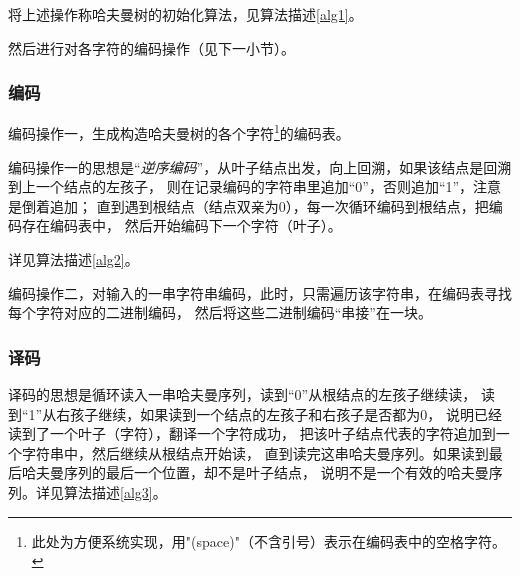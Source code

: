 \documentclass{ctexart}
\begin{document}
    将上述操作称哈夫曼树的初始化算法，见算法描述\ref{alg1}。

    然后进行对各字符的编码操作（见下一小节）。

    \subsubsection{编码}
    编码操作一，生成构造哈夫曼树的各个字符\footnote{此处为方便系统实现，用"(space)"（不含引号）表示在编码表中的空格字符。}的编码表。

    编码操作一的思想是“\emph{逆序编码}”，从叶子结点出发，向上回溯，如果该结点是回溯到上一个结点的左孩子，
    则在记录编码的字符串里追加“0”，否则追加“1”，注意是倒着追加；
    直到遇到根结点（结点双亲为0），每一次循环编码到根结点，把编码存在编码表中，
    然后开始编码下一个字符（叶子）。

    详见算法描述\ref{alg2}。

    编码操作二，对输入的一串字符串编码，此时，只需遍历该字符串，在编码表寻找每个字符对应的二进制编码，
    然后将这些二进制编码“串接”在一块。

    \subsubsection{译码}
    译码的思想是循环读入一串哈夫曼序列，读到“0”从根结点的左孩子继续读，
    读到“1”从右孩子继续，如果读到一个结点的左孩子和右孩子是否都为0，
    说明已经读到了一个叶子（字符），翻译一个字符成功，
    把该叶子结点代表的字符追加到一个字符串中，然后继续从根结点开始读，
    直到读完这串哈夫曼序列。如果读到最后哈夫曼序列的最后一个位置，却不是叶子结点，
    说明不是一个有效的哈夫曼序列。详见算法描述\ref{alg3}。
    
\end{document}
